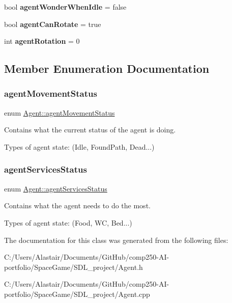 \begin{DoxyCompactItemize}
\mbox{\label{class_agent_af3384cfb4c86b2ca093ad02a4ce57d37}} 
bool {\bfseries agent\+Wonder\+When\+Idle} = false
\item 
\mbox{\label{class_agent_ab150cbcd976d2c50b1f34503c3a98168}} 
bool {\bfseries agent\+Can\+Rotate} = true
\item 
\mbox{\label{class_agent_a02a2a7245b8677b8bcdf3bd311f5a420}} 
int {\bfseries agent\+Rotation} = 0
\end{DoxyCompactItemize}


\subsection{Member Enumeration Documentation}
\mbox{\label{class_agent_af0b2c4596f7df623b5912509a09d0449}} 
\subsubsection{\texorpdfstring{agent\+Movement\+Status}{agentMovementStatus}}
{\footnotesize\ttfamily enum \hyperlink{class_agent_af0b2c4596f7df623b5912509a09d0449}{Agent\+::agent\+Movement\+Status}}



Contains what the current status of the agent is doing. 

Types of agent state\+: (Idle, Found\+Path, Dead...) \mbox{\label{class_agent_ac7c6344403211868f101f7903fa9cb82}} 
\subsubsection{\texorpdfstring{agent\+Services\+Status}{agentServicesStatus}}
{\footnotesize\ttfamily enum \hyperlink{class_agent_ac7c6344403211868f101f7903fa9cb82}{Agent\+::agent\+Services\+Status}}



Contains what the agent needs to do the most. 

Types of agent state\+: (Food, WC, Bed...) 

The documentation for this class was generated from the following files\+:\begin{DoxyCompactItemize}
\item 
C\+:/\+Users/\+Alastair/\+Documents/\+Git\+Hub/comp250-\/\+A\+I-\/portfolio/\+Space\+Game/\+S\+D\+L\+\_\+project/Agent.\+h\item 
C\+:/\+Users/\+Alastair/\+Documents/\+Git\+Hub/comp250-\/\+A\+I-\/portfolio/\+Space\+Game/\+S\+D\+L\+\_\+project/Agent.\+cpp\end{DoxyCompactItemize}
